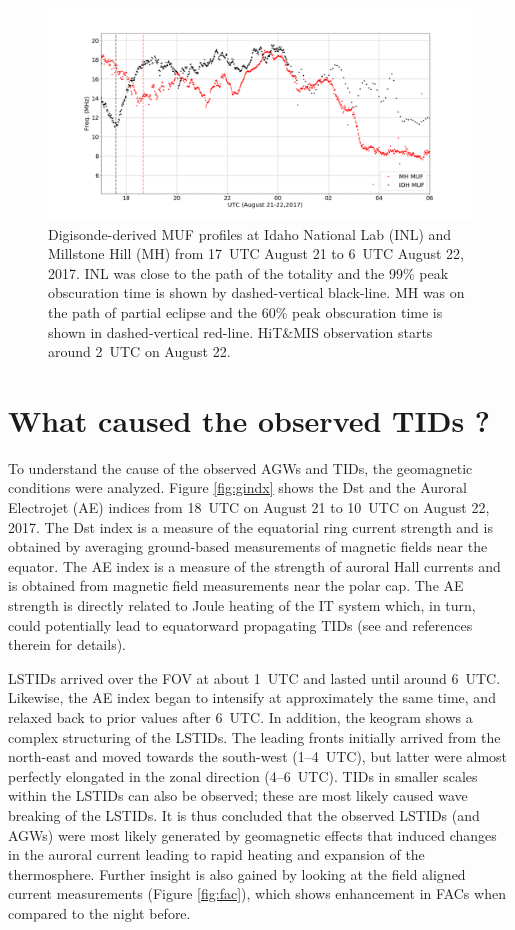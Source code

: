 \documentclass[crop=false,class=mitthesis,oneside,font=12pt]{standalone}
\begin{document}
\begin{figure}[H]
\centering\includegraphics[width=35pc]{digi_muf_21-22.png}
\caption{Digisonde-derived MUF profiles at Idaho National Lab (INL) and Millstone Hill (MH) from 17~UTC August 21 to 6~UTC August 22, 2017. INL was close to the path of the totality and the  99\% peak obscuration time is shown by dashed-vertical black-line. MH was on the path of partial eclipse and the 60\% peak obscuration time is shown in dashed-vertical red-line. HiT\&MIS observation starts around 2~UTC on August 22.}
\label{fig:digi}
\end{figure}

\section{What caused the observed TIDs ?}
To understand the cause of the observed AGWs and TIDs, the geomagnetic conditions were analyzed. Figure \ref{fig:gindx} shows the Dst and the Auroral Electrojet (AE) indices from 18~UTC on August 21 to 10~UTC on August 22, 2017. The Dst  index is a measure of the equatorial ring current strength and is obtained by averaging ground-based measurements of magnetic fields near the equator. The AE index is a measure of the strength of auroral Hall currents and is obtained from magnetic field measurements near the polar cap. The AE strength is directly related to Joule heating of the IT system \citep{ae_joule} which, in turn, could potentially lead to equatorward propagating TIDs (see \citep{kauristie_dst} and references therein for details). 
  
LSTIDs arrived over the FOV at about 1~UTC and lasted until around 6~UTC. Likewise, the AE index began to intensify at approximately the same time, and relaxed back to prior values after 6~UTC. In addition, the keogram shows a complex structuring of the LSTIDs. The leading fronts initially arrived from the north-east and moved towards the south-west (1--4~UTC), but latter were almost perfectly elongated in the zonal direction (4--6~UTC). TIDs in smaller scales within the LSTIDs can also be observed; these are most likely caused wave breaking of the LSTIDs. It is thus concluded that the observed LSTIDs (and AGWs) were most likely generated by geomagnetic effects that induced changes in the auroral current leading to rapid heating and expansion of the thermosphere. Further insight is also gained by looking at the field aligned current measurements (Figure \ref{fig:fac}), which shows enhancement in FACs when compared to the night before.
\end{document}
